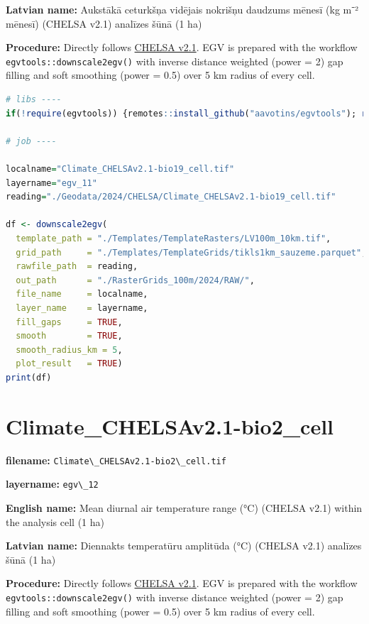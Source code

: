 \documentclass[
]{book}
\newcommand{\passthrough}[1]{#1}
\begin{document}
\textbf{Latvian name:} Aukstākā ceturkšņa vidējais nokrišņu daudzums mēnesī (kg m⁻² mēnesī) (CHELSA v2.1) analīzes šūnā (1 ha)

\textbf{Procedure:} Directly follows \hyperref[Ch04.11]{CHELSA v2.1}. EGV is prepared with the
workflow \passthrough{\lstinline!egvtools::downscale2egv()!} with inverse distance weighted (power = 2)
gap filling and soft smoothing (power = 0.5) over 5 km radius of every cell.

\begin{lstlisting}[language=R]
# libs ----
if(!require(egvtools)) {remotes::install_github("aavotins/egvtools"); require(egvtools)}

# job ----

localname="Climate_CHELSAv2.1-bio19_cell.tif"
layername="egv_11"
reading="./Geodata/2024/CHELSA/Climate_CHELSAv2.1-bio19_cell.tif"

df <- downscale2egv(
  template_path = "./Templates/TemplateRasters/LV100m_10km.tif",
  grid_path     = "./Templates/TemplateGrids/tikls1km_sauzeme.parquet",
  rawfile_path  = reading,
  out_path      = "./RasterGrids_100m/2024/RAW/",
  file_name     = localname,
  layer_name    = layername,
  fill_gaps     = TRUE,
  smooth        = TRUE,
  smooth_radius_km = 5,
  plot_result   = TRUE)
print(df)
\end{lstlisting}

\section{Climate\_CHELSAv2.1-bio2\_cell}\label{ch06.012}

\textbf{filename:} \passthrough{\lstinline!Climate\_CHELSAv2.1-bio2\_cell.tif!}

\textbf{layername:} \passthrough{\lstinline!egv\_12!}

\textbf{English name:} Mean diurnal air temperature range (°C) (CHELSA v2.1) within the analysis cell (1 ha)

\textbf{Latvian name:} Diennakts temperatūru amplitūda (°C) (CHELSA v2.1) analīzes šūnā (1 ha)

\textbf{Procedure:} Directly follows \hyperref[Ch04.11]{CHELSA v2.1}. EGV is prepared with the
workflow \passthrough{\lstinline!egvtools::downscale2egv()!} with inverse distance weighted (power = 2)
gap filling and soft smoothing (power = 0.5) over 5 km radius of every cell.
\end{document}
